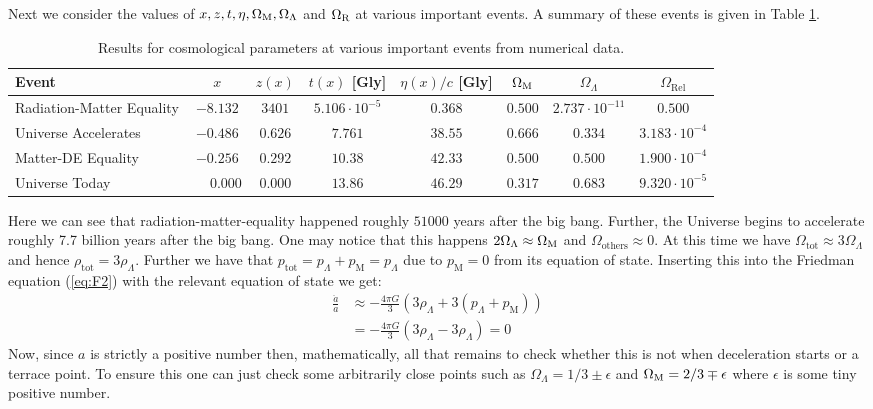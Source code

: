 \documentclass[%
reprint,
 amsmath,amssymb,
 aps,
]{revtex4-2}
\begin{document}
Next we consider the values of $x,z,t,\eta,\Omega_\text M, \Omega_\Lambda$ and $\Omega_\text R$ at various important events. A summary of these events is given in Table \ref{tab:cosmo_events}.
\renewcommand{\arraystretch}{1.25}
\begin{table}[ht!] %
	\caption{Results for cosmological parameters at various important events from numerical data.}
	\begin{tabular}{|l|c|c|c|c|c|c|c|}
		\hline
		Event & $x$ & $z(x)$ & $t(x)$ [Gly] & $\eta(x)/c$ [Gly] & $\Omega_\text M$ & $\Omega_{\Lambda}$ & $\Omega_{\text{Rel}}$ \\
		\hline
		Radiation-Matter Equality  & $-8.132$ & $3401$ & $5.106 \cdot 10^{-5}$ & $0.368$ & $0.500$ & $2.737 \cdot 10^{-11}$ & $0.500$ \\
		\hline
		Universe Accelerates & $-0.486$ & $0.626$ & $7.761$ & $38.55$ & $0.666$ & $0.334$ & $3.183\cdot10^{-4}$ \\
		\hline
		Matter-DE Equality & $-0.256$ & $0.292$ & $10.38$ & $42.33$ & $0.500$ & $0.500$ & $1.900\cdot10^{-4}$ \\
		\hline
		Universe Today & $\phantom{-}0.000 $ & $0.000 $ & $13.86$ & $46.29$ & $0.317$ & $0.683$ & $9.320 \cdot 10^{-5}$ \\
		\hline
	\end{tabular}
	\label{tab:cosmo_events}
\end{table}

Here we can see that radiation-matter-equality happened roughly $51000$ years after the big bang. Further, the Universe begins to accelerate roughly 7.7 billion years after the big bang. One may notice that this happens $2\Omega_{\Lambda}\approx\Omega_{\text M}$ and $\Omega_{\text{others}}\approx0$. At this time we have $\Omega_{\text{tot}}\approx3\Omega_{\Lambda}$ and hence $\rho_\text{tot}=3\rho_\Lambda$. Further we have that $p_\text{tot}=p_\Lambda+p_\text{M}=p_\Lambda$ due to $p_\text{M}=0$ from its equation of state. Inserting this into the Friedman equation (\ref{eq:F2}) with the relevant equation of state we get:
\begin{align*}
	\frac{\ddot{a}}{a}&\approx -\frac{4\pi G}{3}(3\rho_\Lambda+3(p_\Lambda+p_\text{M}))\\
	&=-\frac{4\pi G}{3}(3\rho_\Lambda-3\rho_\Lambda)=0
\end{align*}
Now, since $a$ is strictly a positive number then, mathematically, all that remains to check whether this is not when deceleration starts or a terrace point. To ensure this one can just check some arbitrarily close points such as $\Omega_{\Lambda}=1/3\pm\epsilon$ and $\Omega_{\text M}=2/3\mp\epsilon$ where $\epsilon$ is some tiny positive number.
\end{document}
